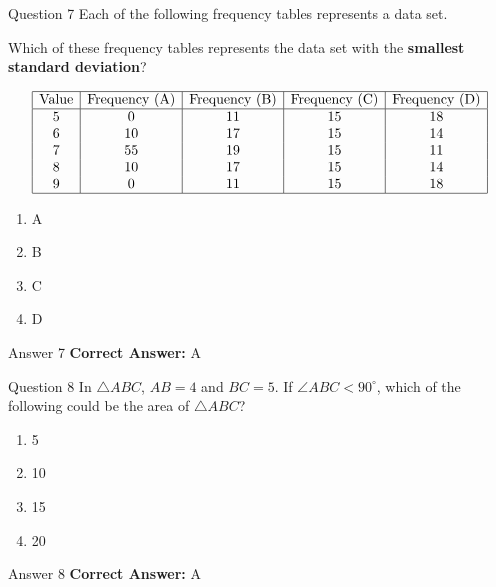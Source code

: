 \documentclass{beamer}
\begin{document}
\begin{frame}{Question 7}
\small
Each of the following frequency tables represents a data set.

Which of these frequency tables represents the data set with the \textbf{smallest standard deviation}?

\[
\begin{array}{|c|c|c|c|c|}
\hline
\text{Value} & \text{Frequency (A)} & \text{Frequency (B)} & \text{Frequency (C)} & \text{Frequency (D)} \\
\hline
5 & 0 & 11 & 15 & 18 \\
6 & 10 & 17 & 15 & 14 \\
7 & 55 & 19 & 15 & 11 \\
8 & 10 & 17 & 15 & 14 \\
9 & 0 & 11 & 15 & 18 \\
\hline
\end{array}
\]
\vspace{0.35cm}
\begin{enumerate}
    \item[A.] A
    \item[B.] B
    \item[C.] C
    \item[D.] D
\end{enumerate}
\end{frame}
\begin{frame}{Answer 7}
\small
\textbf{Correct Answer:} A
\end{frame}

\begin{frame}{Question 8}
\small
In \(\triangle ABC\), \(AB = 4\) and \(BC = 5\). If \(\angle ABC < 90^\circ\), which of the following could be the area of \(\triangle ABC\)?
\vspace{0.35cm}
\begin{enumerate}
    \item[A.] 5
    \item[B.] 10
    \item[C.] 15
    \item[D.] 20
\end{enumerate}
\end{frame}
\begin{frame}{Answer 8}
\small
\textbf{Correct Answer:} A
\end{frame}
\end{document}
